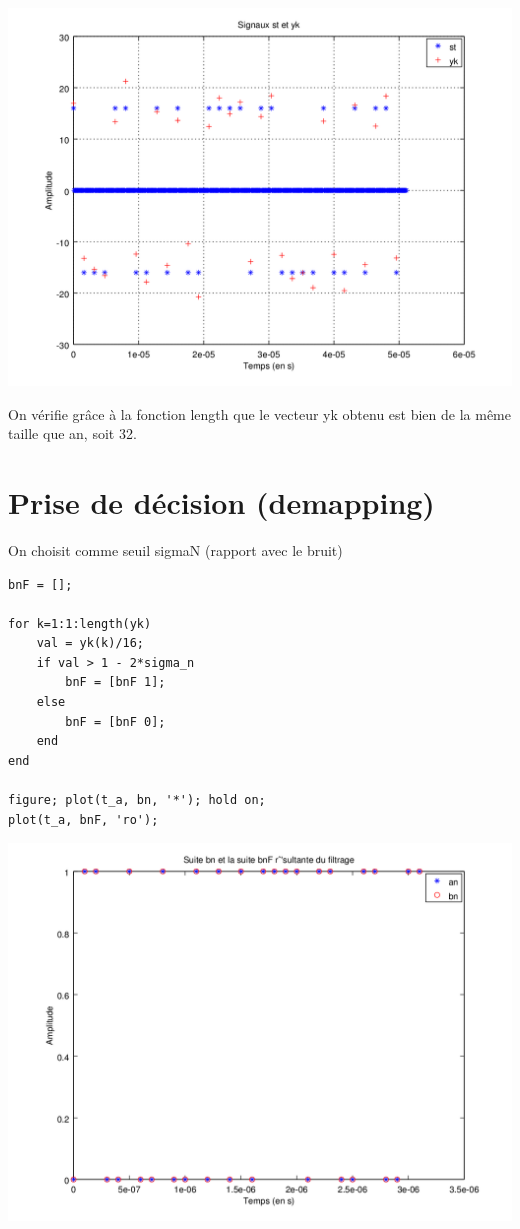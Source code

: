 \documentclass{acm_proc_article-sp}
\begin{document}
\begin{center}
\includegraphics[scale=0.45]{yk_13.png}
\end{center}

On vérifie grâce à la fonction length que le vecteur yk obtenu est bien de la même taille que an, soit 32.


\section{Prise de décision (demapping)}

On choisit comme seuil sigmaN (rapport avec le bruit)

\begin{center}
\begin{lstlisting}
bnF = [];

for k=1:1:length(yk)
    val = yk(k)/16;
    if val > 1 - 2*sigma_n
        bnF = [bnF 1];
    else
        bnF = [bnF 0];
    end
end

figure; plot(t_a, bn, '*'); hold on;
plot(t_a, bnF, 'ro');
\end{lstlisting}

\includegraphics[scale=0.45]{bn_bnF_14.png}
\end{center}
\end{document}
